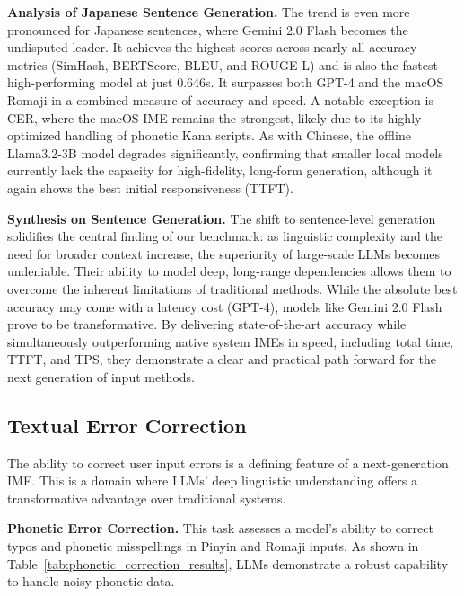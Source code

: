 \documentclass[10pt, a4paper]{article}
\begin{document}
\textbf{Analysis of Japanese Sentence Generation.}
The trend is even more pronounced for Japanese sentences, where {Gemini 2.0 Flash} becomes the undisputed leader. It achieves the highest scores across nearly all accuracy metrics (SimHash, BERTScore, BLEU, and ROUGE-L) and is also the fastest high-performing model at just 0.646s. It surpasses both {GPT-4} and the {macOS Romaji} in a combined measure of accuracy and speed. A notable exception is CER, where the macOS IME remains the strongest, likely due to its highly optimized handling of phonetic Kana scripts. As with Chinese, the offline {Llama3.2-3B} model degrades significantly, confirming that smaller local models currently lack the capacity for high-fidelity, long-form generation, although it again shows the best initial responsiveness (TTFT).

\textbf{Synthesis on Sentence Generation.}
The shift to sentence-level generation solidifies the central finding of our benchmark: as linguistic complexity and the need for broader context increase, the superiority of large-scale LLMs becomes undeniable. Their ability to model deep, long-range dependencies allows them to overcome the inherent limitations of traditional methods. While the absolute best accuracy may come with a latency cost ({GPT-4}), models like {Gemini 2.0 Flash} prove to be transformative. By delivering state-of-the-art accuracy while simultaneously outperforming native system IMEs in speed, including total time, TTFT, and TPS, they demonstrate a clear and practical path forward for the next generation of input methods.

\subsection{Textual Error Correction}

The ability to correct user input errors is a defining feature of a next-generation IME. This is a domain where LLMs' deep linguistic understanding offers a transformative advantage over traditional systems.

\textbf{Phonetic Error Correction.}
This task assesses a model's ability to correct typos and phonetic misspellings in Pinyin and Romaji inputs. As shown in Table~\ref{tab:phonetic_correction_results}, LLMs demonstrate a robust capability to handle noisy phonetic data.
\end{document}
